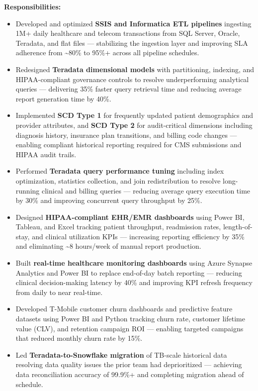 \documentclass[a4paper,10pt]{article}
\begin{document}
\textbf{Responsibilities:}
\begin{itemize}
    \item Developed and optimized \textbf{SSIS and Informatica ETL pipelines} ingesting 1M+ daily healthcare and telecom transactions from SQL Server, Oracle, Teradata, and flat files — stabilizing the ingestion layer and improving SLA adherence from \textasciitilde 80\% to 95\%+ across all pipeline schedules.
    \item Redesigned \textbf{Teradata dimensional models} with partitioning, indexing, and HIPAA-compliant governance controls to resolve underperforming analytical queries — delivering 35\% faster query retrieval time and reducing average report generation time by 40\%.
    \item Implemented \textbf{SCD Type 1} for frequently updated patient demographics and provider attributes, and \textbf{SCD Type 2} for audit-critical dimensions including diagnosis history, insurance plan transitions, and billing code changes — enabling compliant historical reporting required for CMS submissions and HIPAA audit trails.
    \item Performed \textbf{Teradata query performance tuning} including index optimization, statistics collection, and join redistribution to resolve long-running clinical and billing queries — reducing average query execution time by 30\% and improving concurrent query throughput by 25\%.
    \item Designed \textbf{HIPAA-compliant EHR/EMR dashboards} using Power BI, Tableau, and Excel tracking patient throughput, readmission rates, length-of-stay, and clinical utilization KPIs — increasing reporting efficiency by 35\% and eliminating \textasciitilde 8 hours/week of manual report production.
    \item Built \textbf{real-time healthcare monitoring dashboards} using Azure Synapse Analytics and Power BI to replace end-of-day batch reporting — reducing clinical decision-making latency by 40\% and improving KPI refresh frequency from daily to near real-time.
    \item Developed T-Mobile customer churn dashboards and predictive feature datasets using Power BI and Python tracking churn rate, customer lifetime value (CLV), and retention campaign ROI — enabling targeted campaigns that reduced monthly churn rate by 15\%.
    \item Led \textbf{Teradata-to-Snowflake migration} of TB-scale historical data resolving data quality issues the prior team had deprioritized — achieving data reconciliation accuracy of 99.9\%+ and completing migration ahead of schedule.

\end{itemize}
\end{document}

